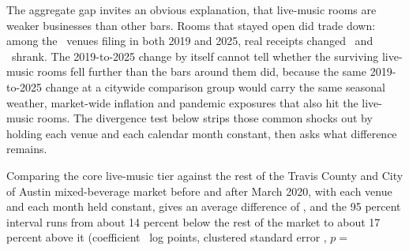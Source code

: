 The aggregate gap invites an obvious explanation, that live-music rooms are
weaker businesses than other bars. Rooms that stayed open did trade down:
among the \NVenueBalancedN\ venues filing in both 2019 and 2025, real receipts
changed \NVenueBalancedPctTwoZeroOneNineTwoZeroTwoFive\ and
\NVenueShrankBalancedN\ shrank. The 2019-to-2025 change by itself cannot tell
whether the surviving live-music rooms fell further than the bars around them
did, because the same 2019-to-2025 change at a citywide comparison group would
carry the same seasonal weather, market-wide inflation and pandemic exposures
that also hit the live-music rooms. The divergence test below strips those
common shocks out by holding each venue and each calendar month constant,
then asks what difference remains.

Comparing the core live-music tier against the rest of the Travis County and
City of Austin mixed-beverage market before and after March 2020, with each
venue and each month held constant, gives an average difference of
\NVenueDidPct, and the 95 percent interval runs from about 14 percent below
the rest of the market to about 17 percent above it (coefficient
\NVenueDidCoef\ log points, clustered standard error \NVenueDidSe, $p =$

